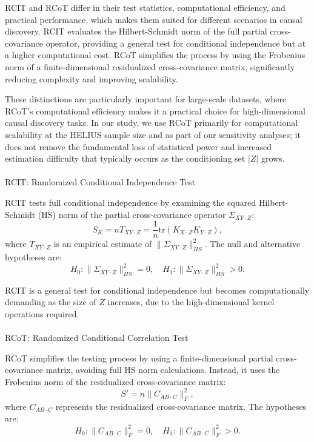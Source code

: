 \documentclass[
]{article}
\makeatletter
\let\oldparagraph\paragraph
\renewcommand{\paragraph}{
    \@ifstar
      \xxxParagraphStar
      \xxxParagraphNoStar
  }
\newcommand{\xxxParagraphStar}[1]{\oldparagraph*{#1}\mbox{}}
\newcommand{\xxxParagraphNoStar}[1]{\oldparagraph{#1}\mbox{}}
\makeatother
\begin{document}
RCIT and RCoT differ in their test statistics, computational efficiency,
and practical performance, which makes them suited for different
scenarios in causal discovery. RCIT evaluates the Hilbert-Schmidt norm
of the full partial cross-covariance operator, providing a general test
for conditional independence but at a higher computational cost. RCoT
simplifies the process by using the Frobenius norm of a
finite-dimensional residualized cross-covariance matrix, significantly
reducing complexity and improving scalability.

These distinctions are particularly important for large-scale datasets,
where RCoT's computational efficiency makes it a practical choice for
high-dimensional causal discovery tasks.
\textcolor{BrickRed}{In our study, we use RCoT primarily for computational scalability at the HELIUS sample size and as part of our sensitivity analyses; it does not remove the fundamental loss of statistical power and increased estimation difficulty that typically occurs as the conditioning set $|Z|$ grows.}

\paragraph{RCIT: Randomized Conditional Independence
Test}\label{rcit-randomized-conditional-independence-test}

RCIT tests full conditional independence by examining the squared
Hilbert-Schmidt (HS) norm of the partial cross-covariance operator
\(\Sigma_{XY \cdot Z}\): \[
S_K = n T_{XY \cdot Z} = \frac{1}{n} \text{tr}(K_{X \cdot Z} K_{Y \cdot Z}),
\] where \(T_{XY \cdot Z}\) is an empirical estimate of
\(\|\Sigma_{XY \cdot Z}\|^2_{HS}\). The null and alternative hypotheses
are: \[
H_0: \|\Sigma_{XY \cdot Z}\|^2_{HS} = 0, \quad H_1: \|\Sigma_{XY \cdot Z}\|^2_{HS} > 0.
\]

RCIT is a general test for conditional independence but becomes
computationally demanding as the size of \(Z\) increases, due to the
high-dimensional kernel operations required.

\paragraph{RCoT: Randomized Conditional Correlation
Test}\label{rcot-randomized-conditional-correlation-test}

RCoT simplifies the testing process by using a finite-dimensional
partial cross-covariance matrix, avoiding full HS norm calculations.
Instead, it uses the Frobenius norm of the residualized cross-covariance
matrix: \[
S' = n \|C_{AB \cdot C}\|_F^2,
\] where \(C_{AB \cdot C}\) represents the residualized cross-covariance
matrix. The hypotheses are: \[
H_0: \|C_{AB \cdot C}\|_F^2 = 0, \quad H_1: \|C_{AB \cdot C}\|_F^2 > 0.
\]
\end{document}
